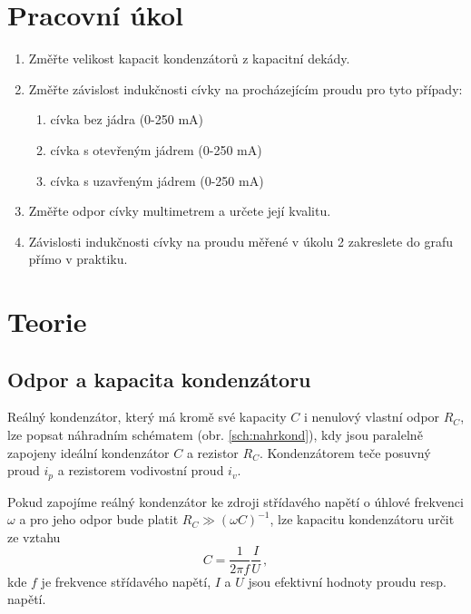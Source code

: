 \documentclass{../concepts/prepareprotokol} %
\begin{document}
\renewcommand{\figurename}{Graf}
\renewcommand{\refname}{Literatura}

\maketitle

\section{Pracovní úkol}
\begin{enumerate}
    \item Změřte velikost kapacit kondenzátorů z kapacitní dekády.
    \item Změřte závislost indukčnosti cívky na procházejícím proudu pro tyto případy:
    \begin{enumerate}
        \item cívka bez jádra (0-250 mA)
        \item cívka s otevřeným jádrem (0-250 mA)
        \item cívka s uzavřeným jádrem (0-250 mA)
    \end{enumerate}

    \item Změřte odpor cívky multimetrem a určete její kvalitu.
    \item Závislosti indukčnosti cívky na proudu měřené v úkolu 2 zakreslete do grafu přímo v praktiku.
\end{enumerate}

\section{Teorie}
\subsection{Odpor a kapacita kondenzátoru}

Reálný kondenzátor, který má kromě své kapacity $C$ i nenulový vlastní odpor $R_C$, lze popsat náhradním schématem (obr. \ref{sch:nahrkond}), kdy jsou paralelně zapojeny ideální kondenzátor $C$ a rezistor $R_C$. Kondenzátorem teče posuvný proud $i_p$ a rezistorem vodivostní proud $i_v$.

Pokud zapojíme reálný kondenzátor ke zdroji střídavého napětí o úhlové frekvenci $\omega$ a pro jeho odpor bude platit $R_C \gg (\omega C)^{-1}$, lze kapacitu kondenzátoru určit ze vztahu \cite{studijni}
\begin{equation} \label{eq:c}
    C = \frac{1}{2 \pi f} \frac{I}{U} \, ,
\end{equation}
kde $f$ je frekvence střídavého napětí, $I$ a $U$ jsou efektivní hodnoty proudu resp. napětí.
\end{document}

